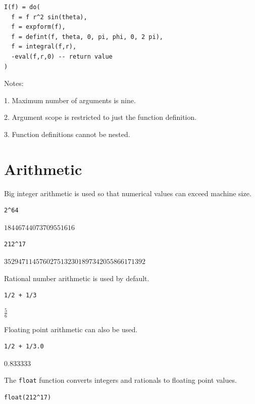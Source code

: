 \documentclass[12pt]{article}
\begin{document}
{\color{blue}
\begin{verbatim}
I(f) = do(
  f = f r^2 sin(theta),
  f = expform(f),
  f = defint(f, theta, 0, pi, phi, 0, 2 pi),
  f = integral(f,r),
  -eval(f,r,0) -- return value
)
\end{verbatim}}

Notes:

1. Maximum number of arguments is nine.

2. Argument scope is restricted to just the function definition.

3. Function definitions cannot be nested.

\newpage

\section{Arithmetic}

Big integer arithmetic is used so that numerical values can
exceed machine size.

{\color{blue}
\begin{verbatim}
2^64
\end{verbatim}
}

$\displaystyle 18446744073709551616$

{\color{blue}
\begin{verbatim}
212^17
\end{verbatim}
}

$\displaystyle 3529471145760275132301897342055866171392$

\bigskip

Rational number arithmetic is used by default.

{\color{blue}
\begin{verbatim}
1/2 + 1/3
\end{verbatim}
}

$\displaystyle \tfrac{5}{6}$

\bigskip

Floating point arithmetic can also be used.

{\color{blue}
\begin{verbatim}
1/2 + 1/3.0
\end{verbatim}
}

$\displaystyle 0.833333$

\bigskip
The \verb$float$ function converts integers and rationals to floating point values.

{\color{blue}
\begin{verbatim}
float(212^17)
\end{verbatim}
}
\end{document}
